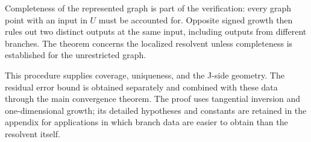Completeness of the represented graph is part of the verification: every
graph point with an input in \(U\) must be accounted for.  Opposite signed
growth then rules out two distinct outputs at the same input, including
outputs from different branches.  The theorem concerns the localized
resolvent unless completeness is established for the unrestricted graph.

This procedure supplies coverage, uniqueness, and the J-side geometry.
The residual error bound is obtained separately and combined with these
data through the main convergence theorem.  The proof uses tangential
inversion and one-dimensional growth; its detailed hypotheses and constants
are retained in the appendix for applications in which branch data are
easier to obtain than the resolvent itself.
